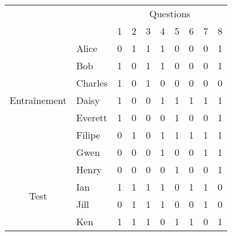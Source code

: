 \documentclass{standalonex}
\newcommand\validation[1]{\textcolor{black!30}{#1}}
\begin{document}
\begin{tabular}{clcccccccc} \toprule
& & \multicolumn{8}{c}{Questions}\\
& & 1 & 2 & \validation3 & 4 & \validation5 & 6 & 7 & \validation8\\ \midrule
\multirow{7}{*}{Entraînement} & Alice & 0 & 1 & 1 & 1 & 0 & 0 & 0 & 1\\
& Bob & 1 & 0 & 1 & 1 & 0 & 0 & 0 & 1\\
& Charles & 1 & 0 & 1 & 0 & 0 & 0 & 0 & 0\\
& Daisy & 1 & 0 & 0 & 1 & 1 & 1 & 1 & 1\\
& Everett & 1 & 0 & 0 & 0 & 1 & 0 & 0 & 1\\
& Filipe & 0 & 1 & 0 & 1 & 1 & 1 & 1 & 1\\
& Gwen & 0 & 0 & 0 & 1 & 0 & 0 & 1 & 1\\ \midrule
\multirow{4}{*}{Test} & Henry & 0 & 0 & \validation0 & 0 & \validation1 & 0 & 0 & \validation1\\
& Ian & 1 & 1 & \validation1 & 1 & \validation0 & 1 & 1 & \validation0\\
& Jill & 0 & 1 & \validation1 & 1 & \validation0 & 0 & 1 & \validation0\\
& Ken & 1 & 1 & \validation1 & 0 & \validation1 & 1 & 0 & \validation1\\ \bottomrule
\end{tabular}
\end{document}
